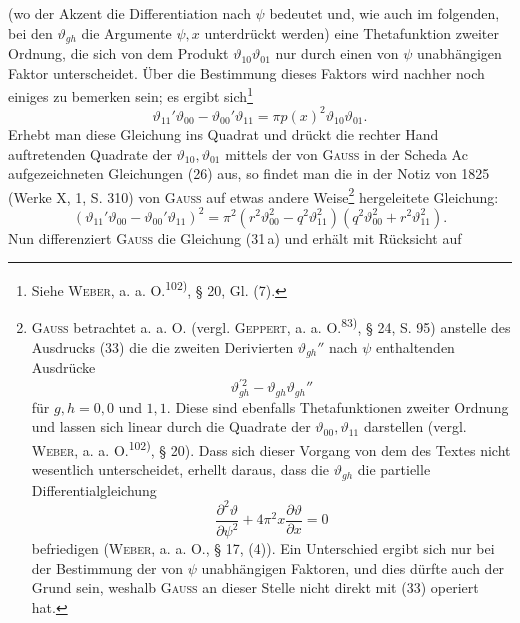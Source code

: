 (wo der Akzent die Differentiation nach \(\psi\) bedeutet und, wie auch im folgenden, bei den \(\vartheta_{gh}\) die Argumente \(\psi,x\) unterdrückt werden) eine Thetafunktion zweiter Ordnung, die sich von dem Produkt \(\vartheta_{10}\vartheta_{01}\) nur durch einen von
\(\psi\) unabhängigen Faktor unterscheidet. Über die Bestimmung dieses Faktors
wird nachher noch einiges zu bemerken sein; es ergibt sich\footnote{Siehe \textsc{Weber}, a. a. O.\textsuperscript{102)}, § 20, Gl. (7).}
\begingroup\makeatletter\tagsleft@true\let\veqno\leqno\makeatother
\begin{equation*}
\vartheta_{11}'\vartheta_{00}-\vartheta_{00}'\vartheta_{11}=\pi p(x)^2\vartheta_{10}\vartheta_{01}.\tag{33}
\end{equation*}
\endgroup
\noindent Erhebt man diese Gleichung ins Quadrat und drückt die rechter Hand auftretenden Quadrate der \(\vartheta_{10},\vartheta_{01}\) mittels der von \textsc{Gauss} in der Scheda Ac aufgezeichneten Gleichungen (26) aus, so findet man die in der Notiz von 1825
(Werke X, 1, S. 310) von \textsc{Gauss} auf etwas andere Weise\footnote{\textsc{Gauss} betrachtet a. a. O. (vergl. \textsc{Geppert}, a. a. O.\textsuperscript{83)}, § 24, S. 95) anstelle des Ausdrucks (33) die die zweiten Derivierten \(\vartheta_{gh}''\) nach \(\psi\) enthaltenden Ausdrücke
\[
\vartheta_{gh}^{\prime 2}-\vartheta_{gh}\vartheta_{gh}''
\]
für \(g,h=0,0\) und \(1,1\). Diese sind ebenfalls Thetafunktionen zweiter Ordnung und lassen sich linear durch die Quadrate der \(\vartheta_{00},\vartheta_{11}\) darstellen (vergl. \textsc{Weber}, a. a. O.\textsuperscript{102)}, § 20). Dass sich dieser Vorgang von dem des Textes nicht wesentlich unterscheidet, erhellt daraus, dass die \(\vartheta_{gh}\) die partielle Differentialgleichung
\[
\frac{\partial^2\vartheta}{\partial\psi^2}+4\pi^2x\frac{\partial\vartheta}{\partial x}=0
\]
befriedigen (\textsc{Weber}, a. a. O., § 17, (4)). Ein Unterschied ergibt sich nur bei der Bestimmung der von \(\psi\) unabhängigen Faktoren, und dies dürfte auch der Grund sein, weshalb \textsc{Gauss} an dieser Stelle nicht direkt mit (33) operiert hat.} hergeleitete Gleichung:
\begingroup\makeatletter\tagsleft@true\let\veqno\leqno\makeatother
\begin{equation*}
(\vartheta_{11}'\vartheta_{00}-\vartheta_{00}'\vartheta_{11})^2
=\pi^2(r^2\vartheta_{00}^2-q^2\vartheta_{11}^2)(q^2\vartheta_{00}^2+r^2\vartheta_{11}^2).\tag{34}
\end{equation*}
\endgroup
\noindent Nun differenziert \textsc{Gauss} die Gleichung (31\,a) und erhält mit Rücksicht auf
